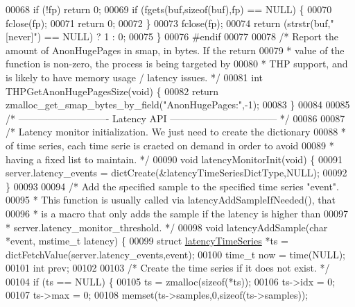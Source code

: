 \begin{DoxyCode}
00068     \textcolor{keywordflow}{if} (!fp) \textcolor{keywordflow}{return} 0;
00069     \textcolor{keywordflow}{if} (fgets(buf,\textcolor{keyword}{sizeof}(buf),fp) == NULL) \{
00070         fclose(fp);
00071         \textcolor{keywordflow}{return} 0;
00072     \}
00073     fclose(fp);
00074     \textcolor{keywordflow}{return} (strstr(buf,\textcolor{stringliteral}{"[never]"}) == NULL) ? 1 : 0;
00075 \}
00076 \textcolor{preprocessor}{#}\textcolor{preprocessor}{endif}
00077 
00078 \textcolor{comment}{/* Report the amount of AnonHugePages in smap, in bytes. If the return}
00079 \textcolor{comment}{ * value of the function is non-zero, the process is being targeted by}
00080 \textcolor{comment}{ * THP support, and is likely to have memory usage / latency issues. */}
00081 \textcolor{keywordtype}{int} THPGetAnonHugePagesSize(\textcolor{keywordtype}{void}) \{
00082     \textcolor{keywordflow}{return} zmalloc\_get\_smap\_bytes\_by\_field(\textcolor{stringliteral}{"AnonHugePages:"},-1);
00083 \}
00084 
00085 \textcolor{comment}{/* ---------------------------- Latency API --------------------------------- */}
00086 
00087 \textcolor{comment}{/* Latency monitor initialization. We just need to create the dictionary}
00088 \textcolor{comment}{ * of time series, each time serie is craeted on demand in order to avoid}
00089 \textcolor{comment}{ * having a fixed list to maintain. */}
00090 \textcolor{keywordtype}{void} latencyMonitorInit(\textcolor{keywordtype}{void}) \{
00091     server.latency\_events = dictCreate(&latencyTimeSeriesDictType,NULL);
00092 \}
00093 
00094 \textcolor{comment}{/* Add the specified sample to the specified time series "event".}
00095 \textcolor{comment}{ * This function is usually called via latencyAddSampleIfNeeded(), that}
00096 \textcolor{comment}{ * is a macro that only adds the sample if the latency is higher than}
00097 \textcolor{comment}{ * server.latency\_monitor\_threshold. */}
00098 \textcolor{keywordtype}{void} latencyAddSample(\textcolor{keywordtype}{char} *event, mstime\_t latency) \{
00099     \textcolor{keyword}{struct} \hyperlink{structlatencyTimeSeries}{latencyTimeSeries} *ts = dictFetchValue(server.latency\_events,event);
00100     time\_t now = time(NULL);
00101     \textcolor{keywordtype}{int} prev;
00102 
00103     \textcolor{comment}{/* Create the time series if it does not exist. */}
00104     \textcolor{keywordflow}{if} (ts == NULL) \{
00105         ts = zmalloc(\textcolor{keyword}{sizeof}(*ts));
00106         ts->idx = 0;
00107         ts->max = 0;
00108         memset(ts->samples,0,\textcolor{keyword}{sizeof}(ts->samples));

\end{DoxyCode}
